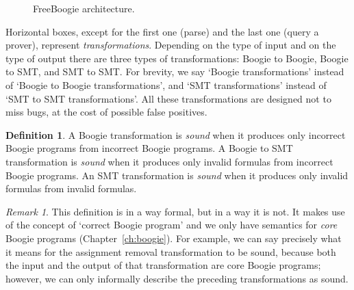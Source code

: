 \documentclass[a4paper]{article}
\theoremstyle{slanted}
\theoremstyle{definition}
\newtheorem{definition}{Definition}
\theoremstyle{remark}
\newtheorem{remark}{Remark}
\begin{document}
\begin{figure}
  \centering
  \caption{FreeBoogie architecture.}
  \label{fig:architecture}
\end{figure}

Horizontal boxes, except for the first one (parse) and the last
one (query a prover), represent \emph{transformations}. Depending
on the type of input and on the type of output there are three
types of transformations: Boogie to Boogie, Boogie to SMT, and
SMT to SMT\null. For brevity, we say `Boogie transformations'
instead of `Boogie to Boogie transformations', and `SMT
transformations' instead of `SMT to SMT transformations'. All
these transformations are designed not to miss bugs, at the cost
of possible false positives.

\begin{definition}
A Boogie transformation is \emph{sound} when it produces only
incorrect Boogie programs from incorrect Boogie programs. A
Boogie to SMT transformation is \emph{sound} when it produces
only invalid formulas from incorrect Boogie programs. An SMT
transformation is \emph{sound} when it produces only invalid
formulas from invalid formulas.
\label{def:sound-transform}
\end{definition}

\begin{remark}
This definition is in a way formal, but in a way it is not.
It makes use of the concept of `correct Boogie program'
and we only have semantics for \emph{core} Boogie programs
(Chapter~\ref{ch:boogie}). For example, we can say precisely what
it means for the assignment removal transformation to be sound,
because both the input and the output of that transformation are
core Boogie programs; however, we can only informally describe
the preceding transformations as sound.
\end{remark}
\end{document}
